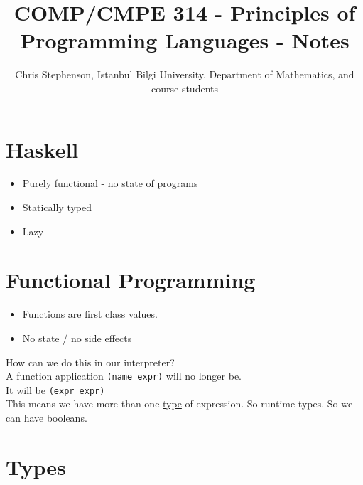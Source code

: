 \documentclass{article}
\begin{document}
\title{COMP/CMPE 314 - Principles of Programming Languages - Notes}
\author{Chris Stephenson, Istanbul Bilgi University, Department of Mathematics, and course students}
\maketitle

\section*{Haskell}
\begin{itemize}
 \item Purely functional - no state of programs
 \item Statically typed
 \item Lazy
\end{itemize}

\section*{Functional Programming}
\begin{itemize}
 \item Functions are first class values.
 \item No state / no side effects
\end{itemize}
\begin{flushleft}
 How can we do this in our interpreter?\\
 A function application \verb|(name expr)| will no longer be.\\
 It will be \verb|(expr expr)|\\
 This means we have more than one \underline{type} of expression. So runtime types. So we can have booleans.
\end{flushleft}
\section{Types}
\end{document}

